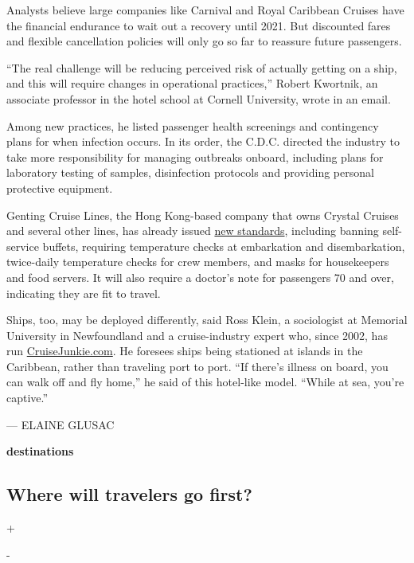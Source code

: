 Analysts believe large companies like Carnival and Royal Caribbean
Cruises have the financial endurance to wait out a recovery until 2021.
But discounted fares and flexible cancellation policies will only go so
far to reassure future passengers.

``The real challenge will be reducing perceived risk of actually getting
on a ship, and this will require changes in operational practices,''
Robert Kwortnik, an associate professor in the hotel school at Cornell
University, wrote in an email.

Among new practices, he listed passenger health screenings and
contingency plans for when infection occurs. In its order, the C.D.C.
directed the industry to take more responsibility for managing outbreaks
onboard, including plans for laboratory testing of samples, disinfection
protocols and providing personal protective equipment.

Genting Cruise Lines, the Hong Kong-based company that owns Crystal
Cruises and several other lines, has already issued
\href{http://gentingcruiselines.com/media/1267/20200408-genting-cruise-lines-announces-enhanced-preventive-measures-setting-new-standards-for-the-fleet-and-the-cruise-industry.pdf}{new
standards}, including banning self-service buffets, requiring
temperature checks at embarkation and disembarkation, twice-daily
temperature checks for crew members, and masks for housekeepers and food
servers. It will also require a doctor's note for passengers 70 and
over, indicating they are fit to travel.

Ships, too, may be deployed differently, said Ross Klein, a sociologist
at Memorial University in Newfoundland and a cruise-industry expert who,
since 2002, has run
\href{http://www.cruisejunkie.com/}{CruiseJunkie.com}. He foresees ships
being stationed at islands in the Caribbean, rather than traveling port
to port. ``If there's illness on board, you can walk off and fly home,''
he said of this hotel-like model. ``While at sea, you're captive.''

--- ELAINE GLUSAC

\textbf{destinations}

\hypertarget{where-will-travelers-go-first}{%
\subsection{Where will travelers go
first?}\label{where-will-travelers-go-first}}

+

-

